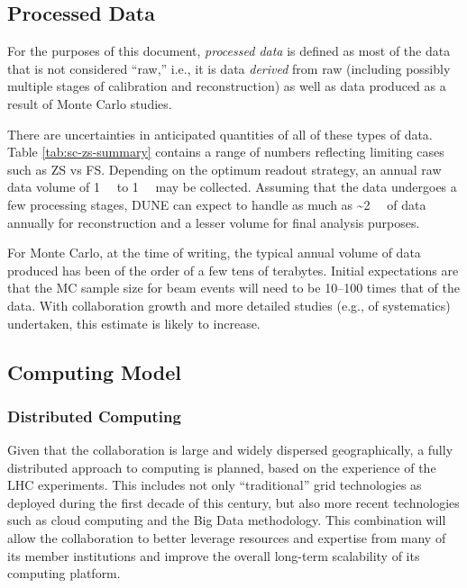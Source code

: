 
\subsection{Processed Data}
\label{sec:detectors-sc-infrastructure-processed-data}
For the purposes of this document, \textit{processed data} is defined as most of the
data that is not considered ``raw,'' i.e., it is data \textit{derived} from raw 
(including possibly multiple stages of calibration and reconstruction)
as well as data produced as a result of Monte Carlo studies.

There are uncertainties in anticipated quantities of all of these
types of data. Table \ref{tab:sc-zs-summary} contains a range of
numbers reflecting limiting cases such as ZS vs FS.  Depending on the
optimum readout strategy, an annual raw data volume of
\SI{1}{\tera\byte} to \SI{1}{\peta\byte} may be collected.  Assuming
that the data undergoes a few processing stages, DUNE %
can expect %
to handle as much as \textasciitilde \SI{2}{\peta\byte} of data
annually for reconstruction and a lesser volume for final analysis
purposes.

For Monte Carlo, at the time of writing, the typical annual volume of data
produced has been of the order of a few tens of terabytes.  Initial
expectations are that the MC sample size for beam events will need to
be 10--100 times that of the data.  With collaboration growth
and more detailed studies (e.g., of systematics) undertaken, 
this estimate is likely to increase.

\subsection{Computing Model}
\label{sec:detectors-sc-infrastructure-computing-model}

\subsubsection{Distributed Computing}


Given that the collaboration is large and widely dispersed
geographically, a fully distributed approach to computing is planned,
based on the experience of the LHC
experiments. This includes not only ``traditional'' grid technologies
as deployed during the first decade of this
century, but also more recent technologies such as cloud computing and the Big
Data methodology. This combination will allow the collaboration to better
leverage resources and expertise from many of its member institutions
and improve the overall long-term scalability of its computing
platform.

